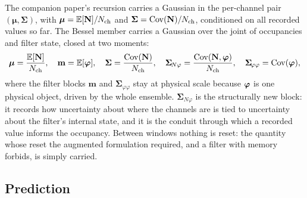 \documentclass[11pt]{article}
\begin{document}
The companion paper's recursion carries a Gaussian in the per-channel pair
$(\bm{\mu},\bm{\Sigma})$, with $\bm{\mu} = \mathbb{E}[\mathbf{N}]/N_{\mathrm{ch}}$ and
$\bm{\Sigma} = \operatorname{Cov}(\mathbf{N})/N_{\mathrm{ch}}$, conditioned on all recorded values so far.
The Bessel member carries a Gaussian over the joint of occupancies and
filter state, closed at two moments:
\begin{equation}
  \bm{\mu} = \frac{\mathbb{E}[\mathbf{N}]}{N_{\mathrm{ch}}}, \quad
  \mathbf{m} = \mathbb{E}[\bm{\varphi}], \quad
  \bm{\Sigma} = \frac{\operatorname{Cov}(\mathbf{N})}{N_{\mathrm{ch}}}, \quad
  \bm{\Sigma}_{\!N\varphi} = \frac{\operatorname{Cov}(\mathbf{N},\bm{\varphi})}{N_{\mathrm{ch}}}, \quad
  \bm{\Sigma}_{\!\varphi\varphi} = \operatorname{Cov}(\bm{\varphi}),
  \label{eq:carried}
\end{equation}
where the filter blocks $\mathbf{m}$ and
$\bm{\Sigma}_{\!\varphi\varphi}$ stay at physical scale because $\bm{\varphi}$ is
one physical object, driven by the whole ensemble.
$\bm{\Sigma}_{\!N\varphi}$ is the structurally new block: it records how
uncertainty about where the channels are is tied to uncertainty about the
filter's internal state, and it is the conduit through which a recorded
value informs the occupancy. Between windows nothing is reset: the
quantity whose reset the augmented formulation required, and a filter with
memory forbids, is simply carried.

\subsection{Prediction}
\end{document}
